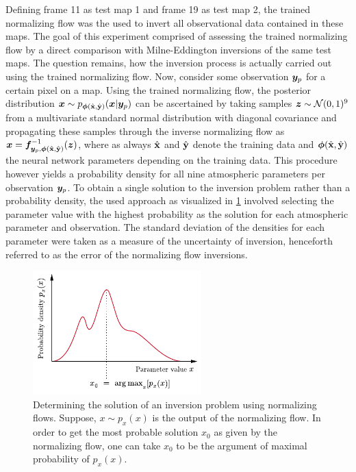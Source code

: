 \documentclass[a4paper,12pt]{report}
\begin{document}
Defining frame 11 as test map 1 and frame 19 as test map 2, the trained normalizing flow was the used to invert all observational data contained in these maps. The goal of this experiment comprised of assessing the trained normalizing flow by a direct comparison with Milne-Eddington inversions of the same test maps. The question remains, how the inversion process is actually carried out using the trained normalizing flow. Now, consider some observation $\bm{y}_{p}$ for a certain pixel on a map. Using the trained normalizing flow, the posterior distribution $\bm{x} \sim p_{\bm{\phi}(\hat{\boldsymbol{\mathbf{x}}},\hat{\boldsymbol{\mathbf{y}}})}(\bm{x}|\bm{y}_p)$ can be ascertained by taking samples $\bm{z} \sim \mathcal{N}(0,1)^9$ from a multivariate standard normal distribution with diagonal covariance and propagating these samples through the inverse normalizing flow as $\bm{x} = \bm{f}_{\bm{y}_p,\bm{\phi}(\hat{\boldsymbol{\mathbf{x}}},\hat{\boldsymbol{\mathbf{y}}})}^{-1}(\bm{z})$, where as always $\hat{\boldsymbol{\mathbf{x}}}$ and $\hat{\boldsymbol{\mathbf{y}}}$ denote the training data and $\bm{\phi}(\hat{\boldsymbol{\mathbf{x}}},\hat{\boldsymbol{\mathbf{y}}})$ the neural network parameters depending on the training data. This procedure however yields a probability density for all nine atmospheric parameters per observation $\bm{y}_p$. To obtain a single solution to the inversion problem rather than a probability density, the used approach as visualized in \cref{fig:argmax} involved selecting the parameter value with the highest probability as the solution for each atmospheric parameter and observation. The standard deviation of the densities for each parameter were taken as a measure of the uncertainty of inversion, henceforth referred to as the error of the normalizing flow inversions.
\begin{figure}[h]
\centering
\includegraphics[width=6.5cm]{figures/argmax.pdf}
\caption{Determining the solution of an inversion problem using normalizing flows. Suppose, $x \sim p_x(x)$ is the output of the normalizing flow. In order to get the most probable solution $x_0$ as given by the normalizing flow, one can take $x_0$ to be the argument of maximal probability of $p_x(x)$.}
\label{fig:argmax}
\end{figure}
\end{document}
